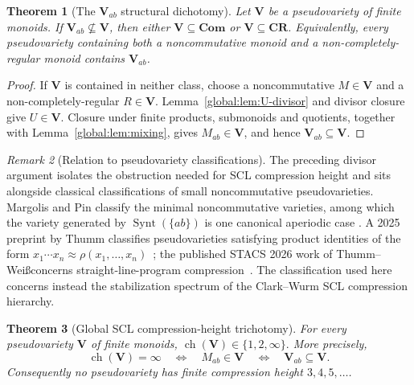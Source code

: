 \documentclass[10pt,a4paper]{article}
\newtheorem{theorem}{Theorem}[section]
\theoremstyle{definition}
\theoremstyle{remark}
\newtheorem{remark}[theorem]{Remark}
\begin{document}
\begin{theorem}[The \(\mathbf V_{ab}\) structural dichotomy]
\label{global:thm:structural}
Let \(\mathbf V\) be a pseudovariety of finite monoids. If
\(\mathbf V_{ab}\not\subseteq\mathbf V\), then either
\(\mathbf V\subseteq\mathbf{Com}\) or \(\mathbf V\subseteq\mathbf{CR}\). Equivalently, every pseudovariety containing both a noncommutative monoid and
a non-completely-regular monoid contains \(\mathbf V_{ab}\).
\end{theorem}

\begin{proof}
If \(\mathbf V\) is contained in neither class, choose a noncommutative
\(M\in\mathbf V\) and a non-completely-regular \(R\in\mathbf V\).
Lemma~\ref{global:lem:U-divisor} and divisor closure give \(U\in\mathbf V\).
Closure under finite products, submonoids and quotients, together with
Lemma~\ref{global:lem:mixing}, gives \(M_{ab}\in\mathbf V\), and hence
\(\mathbf V_{ab}\subseteq\mathbf V\).
\end{proof}

\begin{remark}[Relation to pseudovariety classifications]
The preceding divisor argument isolates the obstruction needed for SCL
compression height and sits alongside classical classifications of small
noncommutative pseudovarieties. Margolis and Pin classify the
minimal noncommutative varieties, among which the variety generated by
\(\operatorname{Synt}(\{ab\})\) is one canonical aperiodic case
\cite{MargolisPin1984}. A 2025 preprint by Thumm classifies pseudovarieties
satisfying product identities of the form
\(x_1\cdots x_n\approx\rho(x_1,\ldots,x_n)\)~\cite{Thumm2025}; the
published STACS 2026 work of Thumm--Wei\ss concerns straight-line-program
compression~\cite{ThummWeiss2026}.  The classification used here concerns instead the stabilization spectrum of
the Clark--Wurm SCL compression hierarchy.
\end{remark}

\begin{theorem}[Global SCL compression-height trichotomy]
\label{global:thm:trichotomy}
For every pseudovariety \(\mathbf V\) of finite monoids,
\(
\operatorname{ch}(\mathbf V)\in\{1,2,\infty\}.
\)
More precisely,
\[
\operatorname{ch}(\mathbf V)=\infty
\quad\Longleftrightarrow\quad
M_{ab}\in\mathbf V
\quad\Longleftrightarrow\quad
\mathbf V_{ab}\subseteq\mathbf V.
\tag{G}
\]
Consequently no pseudovariety has finite compression height \(3,4,5,\ldots\).
\end{theorem}
\end{document}
